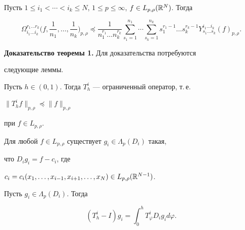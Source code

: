  


\begin{thm} 


Пусть $1\le i_1<\dotsb<i_k\le N$, $1\le p\le\infty$, $f\in 


L_{p,\rho}(\Bbb R^N)$. Тогда 


$$ 


\Omega^{r_1\dotsc r_k}_{i_1\dotsc 


i_k}\bigg(f,\frac{1}{n_1},\dotsc,\frac{1}{n_k} \bigg)_{p,\rho} 


\preceq\frac{1}{n^{r_1}_1\dotsc n^{r_k}_k} 


\sum^{n_1}_{s_1=1}\dotsb\sum^{n_k}_{s_k=1} 


s^{r_1-1}_1\dotsc s^{r_k-1}_k 


Y^{i_1\dotsc i_k}_{s_1\dotsc s_k}(f)_{p,\rho}. 


$$ 


\end{thm} 


 


{\bf Доказательство теоремы 1.} Для доказательства потребуются 


следующие леммы. 


 


\begin{lem} 


Пусть $h\in(0,1)$. Тогда $T^i_h$ --- ограниченный оператор, т.\,е. 


$\|T^i_h f\|_{p,\rho}\preceq\|f\|_{p,\rho}$ 


при $f\in L_{p,\rho}$. 


\end{lem} 


 


\begin{lem} 


Для любой $f\in L_{p,\rho}$ существует $g_i\in\Lambda_p(D_i)$ такая, 


что $D_i g_i=f-c_i$, где 


$c_i=c_i(x_1,\dotsc,x_{i-1},x_{i+1},\dotsc,x_N)\in L_{p,\rho}(\Bbb 


R^{N-1})$. 


\end{lem} 


 


\begin{lem} 


Пусть $g_i\in\Lambda_p(D_i)$. Тогда 


$$ 


(T^i_h-I)g_i=\int^h_0 T^i_\varphi D_i g_i d\varphi. 


$$ 


\end{lem} 


